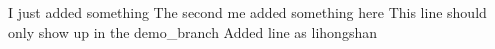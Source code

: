 I just added something
The second me added something here
This line should only show up in the demo_branch
Added line as lihongshan

